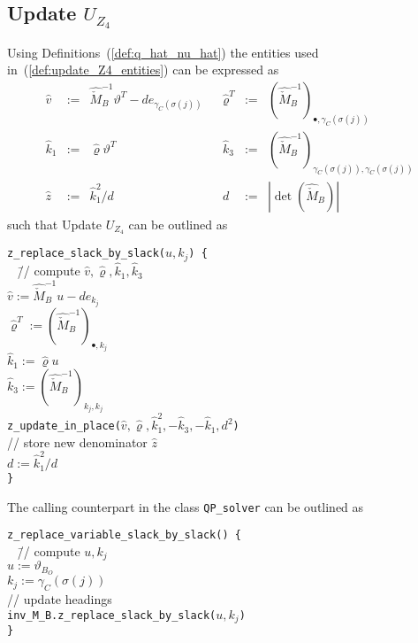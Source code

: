 \documentclass[a4paper]{article}
\begin{document}
\subsection{Update $U_{Z_{4}}$}
Using Definitions~(\ref{def:q_hat_nu_hat}) the entities used
in~(\ref{def:update_Z4_entities}) can be expressed as
\begin{equation}
\label{def:update_Z4_entities_prep}
\begin{array}{rclcrcl}
\hat{v}
&:=&
\hat{\check{M}}_{B}^{-1}\vartheta^{T} -de_{\gamma_{C}(\sigma(j))}
&&
\hat{\varrho}^{T}
&:=&
\left(\hat{\check{M}}_{B}^{-1}\right)_{\bullet, \gamma_{C}(\sigma(j))}
\\
\hat{k}_{1}
&:=&
\hat{\varrho}\vartheta^{T}
&&
\hat{k}_{3}
&:=&
\left(\hat{\check{M}}_{B}^{-1}\right)_{\gamma_{C}(\sigma(j)),
  \gamma_{C}(\sigma(j))}
\\
\hat{z}
&:=&
\hat{k}_{1}^{2}/d
&&
d
&:=&
\left|\det(\hat{\check{M}}_{B})\right|
\end{array}
\end{equation}
such that Update $U_{Z_{4}}$ can be outlined as
\begin{tabbing}
\texttt{z\_replace\_slack\_by\_slack($u, k_{j}$) \{} \\
\texttt{  } \= // compute $\hat{v}, \hat{\varrho}, \hat{k}_{1}, \hat{k}_{3}$ \\
\> \texttt{$\hat{v}:=\hat{\check{M}}_{B}^{-1}u-de_{k_{j}}$} \\
\> \texttt{$\hat{\varrho}^{T}:=
  \left(\hat{\check{M}}_{B}^{-1}\right)_{\bullet,k_{j}}$} \\
\> \texttt{$\hat{k}_{1}:=\hat{\varrho}u$} \\
\> \texttt{$\hat{k}_{3}:=
  \left(\hat{\check{M}}_{B}^{-1}\right)_{k_{j}, k_{j}}$} \\
\> \texttt{z\_update\_in\_place($\hat{v}, \hat{\varrho}, \hat{k}_{1}^{2},
-\hat{k}_{3}, -\hat{k}_{1}, d^{2}$)} \\
\> // store new denominator $\hat{z}$ \\
\> \texttt{$d:=\hat{k}_{1}^{2}/d$} \\
\texttt{\}}
\end{tabbing}
The calling counterpart in the class \texttt{QP\_solver} can be outlined as
\begin{tabbing}
\texttt{z\_replace\_variable\_slack\_by\_slack() \{} \\
\texttt{  } \= // compute $u, k_{j}$ \\
\> \texttt{$u:=\vartheta_{B_{O}}$} \\
\> \texttt{$k_{j}:=\gamma_{C}(\sigma(j))$} \\
\> // update headings \\
\> \texttt{inv\_M\_B.z\_replace\_slack\_by\_slack($u, k_{j}$)}
\\
\texttt{\}}
\end{tabbing}
\end{document}
